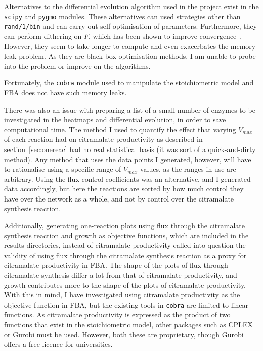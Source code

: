 \documentclass[parskip=full]{scrreprt}
\begin{document}
Alternatives to the differential evolution algorithm used in the project exist in the \texttt{scipy} and \texttt{pygmo} modules. These alternatives can used strategies other than \texttt{rand/1/bin} and can carry out self-optimisation of parameters. Furthermore, they can perform dithering on $F$, which has been shown to improve convergence~\cite{storn_differential_1997}. However, they seem to take longer to compute and even exacerbates the memory leak problem. As they are black-box optimisation methods, I am unable to probe into the problem or improve on the algorithms.

Fortunately, the \texttt{cobra} module used to manipulate the stoichiometric model and FBA does not have such memory leaks.

There was also an issue with preparing a list of a small number of enzymes to be investigated in the heatmaps and differential evolution, in order to save computational time. The method I used to quantify the effect that varying $V_{max}$ of each reaction had on citramalate productivity as described in section~\ref{sec:onereac} had no real statistical basis (it was sort of a quick-and-dirty method). Any method that uses the data points I generated, however, will have to rationalise using a specific range of $V_{max}$ values, as the ranges in use are arbitrary. Using the flux control coefficients was an alternative, and I generated data accordingly, but here the reactions are sorted by how much control they have over the network as a whole, and not by control over the citramalate synthesis reaction.

Additionally, generating one-reaction plots using flux through the citramalate synthesis reaction and growth as objective functions, which are included in the results directories, instead of citramalate productivity called into question the validity of using flux through the citramalate synthesis reaction as a proxy for citramalate productivity in FBA. The shape of the plots of flux through citramalate synthesis differ a lot from that of citramalate productivity, and growth contributes more to the shape of the plots of citramalate productivity. With this in mind, I have investigated using citramalate productivity as the objective function in FBA, but the existing tools in \texttt{cobra} are limited to linear functions. As citramalate productivity is expressed as the product of two functions that exist in the stoichiometric model, other packages such as CPLEX or Gurobi must be used. However, both these are proprietary, though Gurobi offers a free licence for universities.
\end{document}

